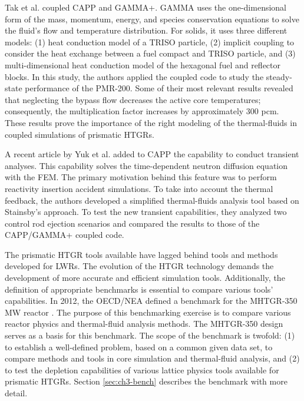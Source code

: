 Tak et al. \cite{tak_cappgamma_2016} coupled CAPP and GAMMA+.
GAMMA uses the one-dimensional form of the mass, momentum, energy, and species conservation equations to solve the fluid's flow and temperature distribution.
For solids, it uses three different models: (1) heat conduction model of a TRISO particle, (2) implicit coupling to consider the heat exchange between a fuel compact and TRISO particle, and (3) multi-dimensional heat conduction model of the hexagonal fuel and reflector blocks.
In this study, the authors applied the coupled code to study the steady-state performance of the PMR-200.
Some of their most relevant results revealed that neglecting the bypass flow decreases the active core temperatures; consequently, the multiplication factor increases by approximately 300 pcm.
These results prove the importance of the right modeling of the thermal-fluids in coupled simulations of prismatic HTGRs.

A recent article by Yuk et al. \cite{yuk_time-dependent_2020} added to CAPP the capability to conduct transient analyses.
This capability solves the time-dependent neutron diffusion equation with the \gls{FEM}.
The primary motivation behind this feature was to perform reactivity insertion accident simulations.
To take into account the thermal feedback, the authors developed a simplified thermal-fluids analysis tool based on Stainsby's approach.
To test the new transient capabilities, they analyzed two control rod ejection scenarios and compared the results to those of the CAPP/GAMMA+ coupled code.

The prismatic HTGR tools available have lagged behind tools and methods developed for \glspl{LWR}.
The evolution of the HTGR technology demands the development of more accurate and efficient simulation tools.
Additionally, the definition of appropriate benchmarks is essential to compare various tools' capabilities.
In 2012, the \gls{OECD}/\gls{NEA} defined a benchmark for the \gls{MHTGR}-350 MW reactor \cite{oecd_nea_benchmark_2017}.
The purpose of this benchmarking exercise is to compare various reactor physics and thermal-fluid analysis methods.
The MHTGR-350 design serves as a basis for this benchmark.
The scope of the benchmark is twofold: (1) to establish a well-defined problem, based on a common given data set, to compare methods and tools in core simulation and thermal-fluid analysis, and (2) to test the depletion capabilities of various lattice physics tools available for prismatic HTGRs.
Section \ref{sec:ch3-bench} describes the benchmark with more detail.

